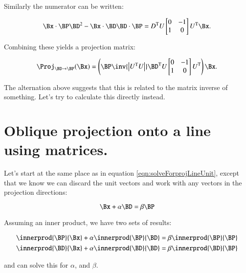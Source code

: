 \documentclass{article}      %
\newcommand{\T}[0]{\text{T}}
\begin{document}
Similarly the numerator can be written:

\[
\Bx \cdot \BP \BD^2 - \Bx \cdot \BD \BD \cdot \BP =
D^\T U
\begin{bmatrix}
0 & -1 \\
1 & 0 \\
\end{bmatrix}
U^\T \Bx.
\]

Combining these yields a projection matrix:

\begin{equation}\label{eqn:matrixprojfromwedge}
\Proj_{\BD \rightarrow \BP}(\Bx) =
\left(
\BP
\inv{
\begin{vmatrix}
U^\T U
\end{vmatrix}
}
\BD^\T U
\begin{bmatrix}
0 & -1 \\
1 & 0 \\
\end{bmatrix}
U^\T\right) \Bx.
\end{equation}

The alternation above suggests that this is related to the matrix inverse of something.  Let's try to calculate this directly instead.

\section{ Oblique projection onto a line using matrices. }

Let's start at the same place as in equation \ref{eqn:solveForprojLineUnit}, except that we know we can discard the unit vectors and work with any vectors in the projection directions:

\begin{equation}\label{eqn:solveForprojLineNonUnit}
\Bx + \alpha \BD = \beta \BP
\end{equation}

Assuming an inner product, we have two sets of results:

\begin{align*}
\innerprod{\BP}{\Bx} + \alpha \innerprod{\BP}{\BD} &= \beta \innerprod{\BP}{\BP} \\
\innerprod{\BD}{\Bx} + \alpha \innerprod{\BD}{\BD} &= \beta \innerprod{\BD}{\BP} \\
\end{align*}

and can solve this for $\alpha$, and $\beta$.
\end{document}
